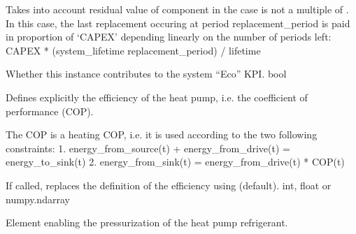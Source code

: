 \documentclass[letterpaper,10pt,english]{sphinxmanual}
\begin{document}
\begin{fulllineitems}
\begin{fulllineitems}
\sphinxAtStartPar
Takes into account residual value of component in the case  is not a multiple of .
In this case, the last replacement occuring at period replacement\_period is paid in proportion of ‘CAPEX’
depending linearly on the number of periods left:
CAPEX * (system\_lifetime \sphinxhyphen{} replacement\_period) / lifetime

\end{fulllineitems}


\begin{fulllineitems}
\label{\detokenize{generated/tamos.production.AbsHP:tamos.production.AbsHP.eco_count}}
\pysigstartsignatures
{}
\pysigstopsignatures
\sphinxAtStartPar
Whether this instance contributes to the system “Eco” KPI.
bool

\end{fulllineitems}


\begin{fulllineitems}
\label{\detokenize{generated/tamos.production.AbsHP:tamos.production.AbsHP.efficiency}}
\pysigstartsignatures
{}
\pysigstopsignatures
\sphinxAtStartPar
Defines explicitly the efficiency of the heat pump, i.e. the coefficient of performance (COP).

\sphinxAtStartPar
The COP is a heating COP, i.e. it is used according to the two following constraints:
1. energy\_from\_source(t) + energy\_from\_drive(t) = energy\_to\_sink(t)
2. energy\_from\_sink(t) = energy\_from\_drive(t) * COP(t)

\sphinxAtStartPar
If called, replaces the definition of the efficiency using  (default).
int, float or numpy.ndarray

\end{fulllineitems}


\begin{fulllineitems}
\label{\detokenize{generated/tamos.production.AbsHP:tamos.production.AbsHP.energy_drive}}
\pysigstartsignatures
{}
\pysigstopsignatures
\sphinxAtStartPar
Element enabling the pressurization of the heat pump refrigerant.


\end{fulllineitems}
\end{fulllineitems}
\end{document}

